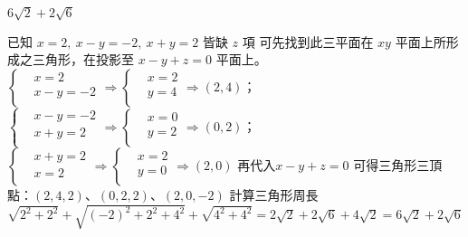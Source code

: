 \begin{QUESTIONS}
\begin{QUESTION}
        \begin{QTAGS}\end{QTAGS}
        \begin{QANS}
            $6 \sqrt{2} + 2\sqrt{6}$
        \end{QANS}
        \begin{QSOLLIST}
			\begin{QSOL}
			已知 $x=2,\ x-y=-2,\ x+y=2$ 皆缺 $z$ 項
			可先找到此三平面在 $xy$ 平面上所形成之三角形，在投影至 $x-y+z=0$ 平面上。
			$\left\{ \begin{aligned}
			  & x=2 \\ 
			 & x-y=-2 \\ 
			\end{aligned} \right.\Rightarrow \left\{ \begin{aligned}
			  & x=2 \\ 
			 & y=4 \\ 
			\end{aligned} \right.\Rightarrow \left( 2,4 \right)$； $\left\{ \begin{aligned}
			  & x-y=-2 \\ 
			 & x+y=2 \\ 
			\end{aligned} \right.\Rightarrow \left\{ \begin{aligned}
			  & x=0 \\ 
			 & y=2 \\ 
			\end{aligned} \right.\Rightarrow \left( 0,2 \right)$；$\left\{ \begin{aligned}
			  & x+y=2 \\ 
			 & x=2 \\ 
			\end{aligned} \right.\Rightarrow \left\{ \begin{aligned}
			  & x=2 \\ 
			 & y=0 \\ 
			\end{aligned} \right.\Rightarrow \left( 2,0 \right)$
			再代入$x-y+z=0$ 可得三角形三頂點：$\left( 2,4,2 \right)$、$\left( 0,2,2 \right)$、$\left( 2,0,-2 \right)$
			計算三角形周長 $\sqrt{{{2}^{2}}+{{2}^{2}}}+\sqrt{{{\left( -2 \right)}^{2}}+{{2}^{2}}+{{4}^{2}}}+\sqrt{{{4}^{2}}+{{4}^{2}}}=2\sqrt{2}+2\sqrt{6}+4\sqrt{2}=6\sqrt{2}+2\sqrt{6}$
			\end{QSOL}
        \end{QSOLLIST}
        \begin{QEMPTYSPACE}
        \end{QEMPTYSPACE}

\end{QUESTION}
\end{QUESTIONS}
